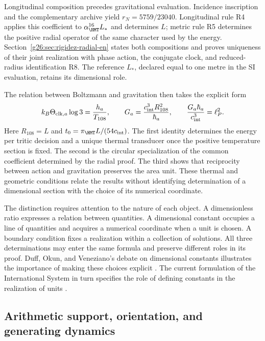 Longitudinal composition precedes gravitational evaluation.
Incidence inscription and the complementary archive yield
\(r_N=5759/23040\). Longitudinal rule R4 applies this coefficient
to \(\alpha_{\HMT}^{16}L_*\) and determines \(L\); metric rule
R5 determines the positive radial operator of the same character used
by the energy. Section~\ref{g26:sec:rigidez-radial-en} states both
compositions and proves uniqueness of their joint realization with
phase action, the conjugate clock, and reduced-radius identification R8.
The reference \(L_*\), declared equal to one metre in the SI
evaluation, retains its dimensional role.

The relation between Boltzmann and gravitation then takes the explicit form
\[
 k_B\Theta_{{\rm clk},a}\log3=\frac{h_a}{T_{108}},\qquad
 G_a=\frac{c_{\rm int}^3R_{108}^2}{\hbar_a},\qquad
 \frac{G_a\hbar_a}{c_{\rm int}^3}=\ell_P^2.
\]
Here \(R_{108}=L\) and \(t_0=\pi_{\HMT}L/(54c_{\rm int})\).
The first identity determines the energy per tritic decision and a
unique thermal transducer once the positive temperature section is
fixed. The second is the circular specialization of the common
coefficient determined by the radial proof. The third shows that reciprocity
between action and gravitation preserves the area unit. These thermal
and geometric conditions relate the results without identifying
determination of a dimensional section with the choice of its numerical
coordinate.

The distinction requires attention to the nature of each object. A
dimensionless ratio expresses a relation between quantities. A dimensional
constant occupies a line of quantities and acquires a numerical coordinate
when a unit is chosen. A boundary condition fixes a realization within
a collection of solutions. All three determinations may enter
the same formula and preserve different roles in its proof.
Duff, Okun, and Veneziano's debate on dimensional constants
illustrates the importance of making these choices explicit
\cite{duffokunveneziano}. The current formulation of the International System
in turn specifies the role of defining constants in the
realization of units \cite{bipm2018,bipmbrochure}.

\subsection{Arithmetic support, orientation, and generating dynamics}

